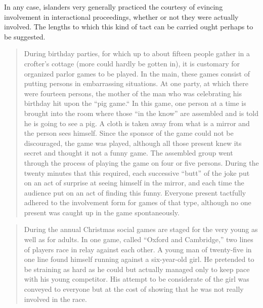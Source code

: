 \documentclass[twoside,symmetric,nobib,justified]{tufte-book}
\begin{document}
In any case, islanders very generally practiced the courtesy of evincing
involvement in interactional proceedings, whether or not they were
actually involved. The lengths to which this kind of tact can be carried
ought perhaps to be suggested.

\begin{quote}
During birthday parties, for which up to about fifteen people gather in
a crofter's cottage (more could hardly be gotten in), it is customary
for organized parlor games to be played. In the main, these games
consist of putting persons in embarrassing situations. At one party, at
which there were fourteen persons, the mother of the man who was
celebrating his birthday hit upon the ``pig game.`` In this game, one
person at a time is brought into the room where those ``in the know''
are assembled and is told he is going to see a pig. A cloth is taken
away from what is a mirror and the person sees himself. Since the
sponsor of the game could not be discouraged, the game was played,
although all those present knew its secret and thought it not a funny
game. The assembled group went through the process of playing the game
on four or five persons. During the twenty minutes that this required,
each successive ``butt'' of the joke put on an act of surprise at seeing
himself in the mirror, and each time the audience put on an act of
finding this funny. Everyone present tactfully adhered to the
involvement form for games of that type, although no one present was
caught up in the game spontaneously.
\end{quote}

\begin{quote}
During the annual Christmas social games are staged for the very young
as well as for adults. In one game, called ``Oxford and Cambridge,'' two
lines of players race in relay against each other. A young man of
twenty-five in one line found himself running against a six-year-old
girl. He pretended to be straining as hard as he could but actually
managed only to keep pace with his young competitor. His attempt to be
considerate of the girl was conveyed to everyone but at the cost of
showing that he was not really involved in the race.
\end{quote}
\end{document}
